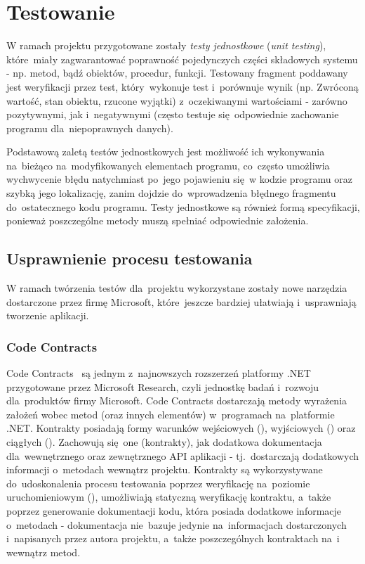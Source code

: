 \section{Testowanie}
W ramach projektu przygotowane zostały \emph{testy jednostkowe} (\emph{unit testing}), które~miały zagwarantować poprawność pojedynczych części składowych systemu - np. metod, bądź obiektów, procedur, funkcji. Testowany fragment poddawany jest weryfikacji przez test, który~wykonuje test i~porównuje wynik (np. Zwróconą wartość, stan obiektu, rzucone wyjątki) z~oczekiwanymi wartościami - zarówno pozytywnymi, jak i~negatywnymi (często testuje się~odpowiednie zachowanie programu dla~niepoprawnych danych). 

Podstawową zaletą testów jednostkowych jest możliwość ich wykonywania na~bieżąco na~modyfikowanych elementach programu, co~często umożliwia wychwycenie błędu natychmiast po~jego pojawieniu się~w kodzie programu oraz szybką jego lokalizację, zanim dojdzie do~wprowadzenia błędnego fragmentu do~ostatecznego kodu programu. Testy jednostkowe są również formą specyfikacji, ponieważ poszczególne metody muszą spełniać odpowiednie założenia. 

\subsection{Usprawnienie procesu testowania}
W ramach twórzenia testów dla~projektu wykorzystane zostały nowe narzędzia dostarczone przez firmę Microsoft, które~jeszcze bardziej ułatwiają i~usprawniają tworzenie aplikacji.

\subsubsection{Code Contracts}
Code Contracts~\cite{ms:codecontracts} są jednym z~najnowszych rozszerzeń platformy .NET przygotowane przez Microsoft Research, czyli jednostkę badań i~rozwoju dla~produktów firmy Microsoft. Code Contracts dostarczają metody wyrażenia założeń wobec metod (oraz innych elementów) w~programach na~platformie .NET. Kontrakty posiadają formy warunków wejściowych (), wyjściowych () oraz ciągłych (). Zachowują się~one (kontrakty), jak dodatkowa dokumentacja dla~wewnętrznego oraz zewnętrznego API aplikacji - tj.~dostarczają dodatkowych informacji o~metodach wewnątrz projektu. Kontrakty są wykorzystywane do~udoskonalenia procesu testowania poprzez weryfikację na~poziomie uruchomieniowym (), umożliwiają statyczną weryfikację kontraktu, a~także poprzez generowanie dokumentacji kodu, która posiada dodatkowe informacje o~metodach - dokumentacja nie~bazuje jedynie na~informacjach dostarczonych i~napisanych przez autora projektu, a~także poszczególnych kontraktach na~i wewnątrz metod.

